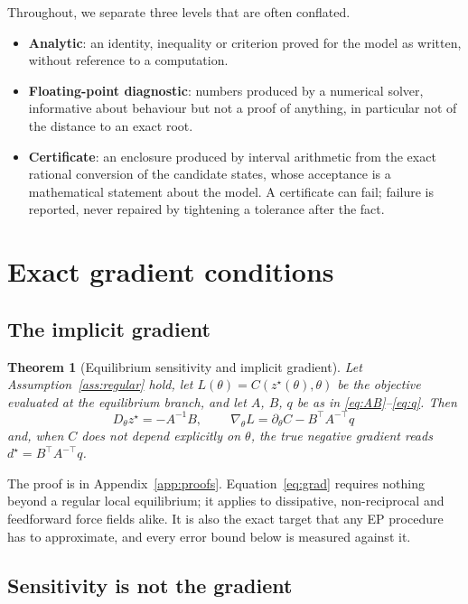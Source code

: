 \documentclass[11pt]{article}
\newtheorem{theorem}{Theorem}
\theoremstyle{definition}
\theoremstyle{remark}
\newcommand{\grad}{\nabla}
\begin{document}
Throughout, we separate three levels that are often conflated.
\begin{itemize}
\item \textbf{Analytic}: an identity, inequality or criterion proved for the model as written,
without reference to a computation.
\item \textbf{Floating-point diagnostic}: numbers produced by a numerical solver, informative
about behaviour but not a proof of anything, in particular not of the distance to an exact root.
\item \textbf{Certificate}: an enclosure produced by interval arithmetic from the exact rational
conversion of the candidate states, whose acceptance is a mathematical statement about the model.
A certificate can fail; failure is reported, never repaired by tightening a tolerance after the
fact.
\end{itemize}

\section{Exact gradient conditions}\label{sec:exact}

\subsection{The implicit gradient}

\begin{theorem}[Equilibrium sensitivity and implicit gradient]\label{thm:implicit}
Let Assumption~\ref{ass:regular} hold, let $L(\theta) = C(z^\star(\theta),\theta)$ be the
objective evaluated at the equilibrium branch, and let $A$, $B$, $q$ be as in
\eqref{eq:AB}--\eqref{eq:q}. Then
\begin{equation}
D_\theta z^\star = -A^{-1}B,
\qquad
\boxed{\ \grad_\theta L = \partial_\theta C - B^{\top} A^{-\top} q\ }
\label{eq:grad}
\end{equation}
and, when $C$ does not depend explicitly on $\theta$, the true negative gradient reads
$d^\star = B^{\top}A^{-\top} q$.
\end{theorem}

The proof is in Appendix~\ref{app:proofs}. Equation~\eqref{eq:grad} requires nothing beyond a
regular local equilibrium; it applies to dissipative, non-reciprocal and feedforward force fields
alike. It is also the exact target that any EP procedure has to approximate, and every error
bound below is measured against it.

\subsection{Sensitivity is not the gradient}
\end{document}
